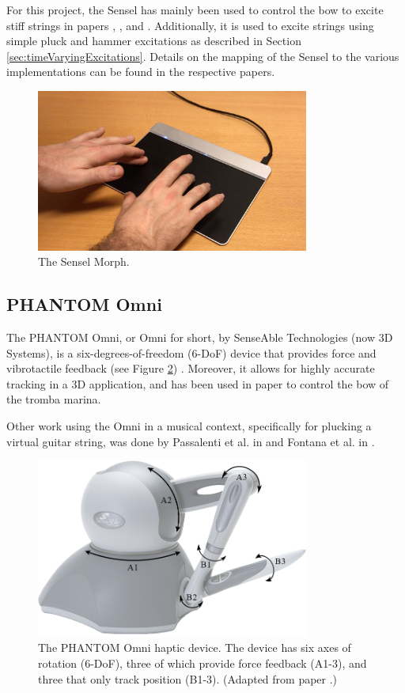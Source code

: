 For this project, the Sensel has mainly been used to control the bow to excite stiff strings in papers \citeP[A], \citeP[B], \citeP[C] and \citeP[D]. Additionally, it is used to excite strings using simple pluck and hammer excitations as described in Section \ref{sec:timeVaryingExcitations}. Details on the mapping of the Sensel to the various implementations can be found in the respective papers.

\begin{figure}[t]
    \centering
    \includegraphics[width=0.8\textwidth]{figures/contributions/realtime/senselHands.jpg}
    \caption{The Sensel Morph. \label{fig:sensel}}
\end{figure}


\subsection{PHANTOM Omni}\label{sec:phantomOmni}
The PHANTOM Omni, or Omni for short, by SenseAble Technologies (now 3D Systems), is a six-degrees-of-freedom (6-DoF) device that provides force and vibrotactile feedback (see Figure \ref{fig:omni}) \cite{OmniAPI2018}. Moreover, it allows for highly accurate tracking in a 3D application, and has been used in paper \citeP[E] to control the bow of the tromba marina. 

Other work using the Omni in a musical context, specifically for plucking a virtual guitar string, was done by Passalenti et al. in \cite{passalenti2019a, passalenti2019b} and Fontana et al. in \cite{Fontana2020}.

\begin{figure}[h]\includegraphics[width=0.8\textwidth]{figures/contributions/realtime/omniSchematic.png}
    \centering
      \caption{The PHANTOM Omni haptic device. The device has six axes of rotation (6-DoF), three of which provide force feedback (A1-3), and three that only track position (B1-3). (Adapted from paper \citeP[E].) \label{fig:omni}}
\end{figure}